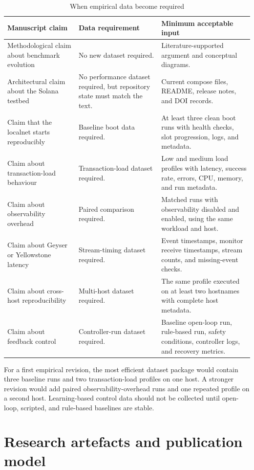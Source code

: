 \documentclass[11pt,a4paper]{article}
\begin{document}
\begin{table}[H]
\centering
\caption{When empirical data become required}
\label{tab:data-readiness}
\begin{tabularx}{\textwidth}{L{3.4cm}Y Y}
\toprule
\textbf{Manuscript claim} & \textbf{Data requirement} & \textbf{Minimum acceptable input} \\
\midrule
Methodological claim about benchmark evolution & No new dataset required. & Literature-supported argument and conceptual diagrams. \\
Architectural claim about the Solana testbed & No performance dataset required, but repository state must match the text. & Current compose files, README, release notes, and DOI records. \\
Claim that the localnet starts reproducibly & Baseline boot data required. & At least three clean boot runs with health checks, slot progression, logs, and metadata. \\
Claim about transaction-load behaviour & Transaction-load dataset required. & Low and medium load profiles with latency, success rate, errors, CPU, memory, and run metadata. \\
Claim about observability overhead & Paired comparison required. & Matched runs with observability disabled and enabled, using the same workload and host. \\
Claim about Geyser or Yellowstone latency & Stream-timing dataset required. & Event timestamps, monitor receive timestamps, stream counts, and missing-event checks. \\
Claim about cross-host reproducibility & Multi-host dataset required. & The same profile executed on at least two hostnames with complete host metadata. \\
Claim about feedback control & Controller-run dataset required. & Baseline open-loop run, rule-based run, safety conditions, controller logs, and recovery metrics. \\
\bottomrule
\end{tabularx}
\end{table}

For a first empirical revision, the most efficient dataset package would contain three baseline runs and two transaction-load profiles on one host. A stronger revision would add paired observability-overhead runs and one repeated profile on a second host. Learning-based control data should not be collected until open-loop, scripted, and rule-based baselines are stable.

\section{Research artefacts and publication model}
\label{sec:artefacts}
\end{document}
